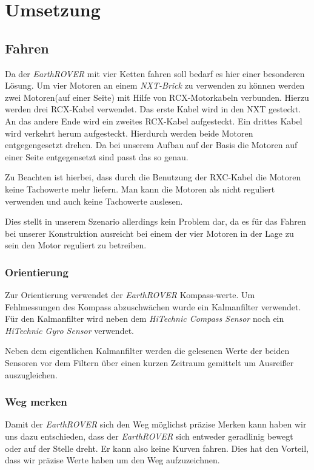 \chapter{Umsetzung}
\section{Fahren}
Da der \textit{EarthROVER} mit vier Ketten fahren soll bedarf es hier einer besonderen Lösung. Um vier Motoren an einem \textit{NXT-Brick} zu verwenden zu können werden zwei Motoren(auf einer Seite) mit Hilfe von RCX-Motorkabeln verbunden. Hierzu werden drei RCX-Kabel verwendet. Das erste Kabel wird in den NXT gesteckt. An das andere Ende wird ein zweites RCX-Kabel aufgesteckt. Ein drittes Kabel wird verkehrt herum aufgesteckt. Hierdurch werden beide Motoren entgegengesetzt drehen. Da bei unserem Aufbau auf der Basis die Motoren auf einer Seite entgegensetzt sind passt das so genau. 


Zu Beachten ist hierbei, dass durch die Benutzung der RXC-Kabel die Motoren keine Tachowerte mehr liefern. Man kann die Motoren als nicht reguliert verwenden und auch keine Tachowerte auslesen.

Dies stellt in unserem Szenario allerdings kein Problem dar, da es für das Fahren bei unserer Konstruktion ausreicht bei einem der vier Motoren in der Lage zu sein den Motor reguliert zu betreiben.

\subsection{Orientierung}
Zur Orientierung verwendet der \textit{EarthROVER} Kompass-werte. Um Fehlmessungen des Kompass abzuschwächen wurde ein Kalmanfilter verwendet. Für den Kalmanfilter wird neben dem \textit{HiTechnic Compass Sensor} noch ein \textit{HiTechnic Gyro Sensor} verwendet.

Neben dem eigentlichen Kalmanfilter werden die gelesenen Werte der beiden Sensoren vor dem Filtern über einen kurzen Zeitraum gemittelt um Ausreißer auszugleichen.

\subsection{Weg merken}
Damit der \textit{EarthROVER} sich den Weg möglichst präzise Merken kann haben wir uns dazu entschieden, dass der \textit{EarthROVER} sich entweder geradlinig bewegt oder auf der Stelle dreht. Er kann also keine Kurven fahren. Dies hat den Vorteil, dass wir präzise Werte haben um den Weg aufzuzeichnen.

